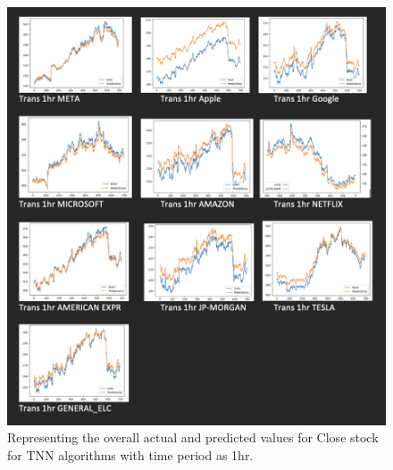 \begin{figure}[ht]
    \centering
    \includegraphics[scale=0.2]{figures/Trans 1hr.png}
    \caption{Representing the overall actual and predicted values for Close stock for TNN algorithms with time period as 1hr.}
    \label{fig:chart_a}
\end{figure}

